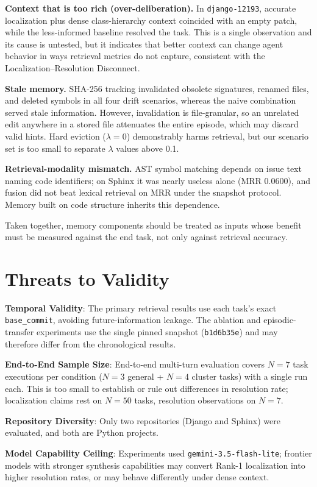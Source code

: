 \documentclass[conference]{IEEEtran}
\begin{document}
\textbf{Context that is too rich (over-deliberation).} In \texttt{django-12193}, accurate localization plus dense class-hierarchy context coincided with an empty patch, while the less-informed baseline resolved the task. This is a single observation and its cause is untested, but it indicates that better context can change agent behavior in ways retrieval metrics do not capture, consistent with the Localization--Resolution Disconnect.

\textbf{Stale memory.} SHA-256 tracking invalidated obsolete signatures, renamed files, and deleted symbols in all four drift scenarios, whereas the naive combination served stale information. However, invalidation is file-granular, so an unrelated edit anywhere in a stored file attenuates the entire episode, which may discard valid hints. Hard eviction ($\lambda = 0$) demonstrably harms retrieval, but our scenario set is too small to separate $\lambda$ values above 0.1.

\textbf{Retrieval-modality mismatch.} AST symbol matching depends on issue text naming code identifiers; on Sphinx it was nearly useless alone (MRR 0.0600), and fusion did not beat lexical retrieval on MRR under the snapshot protocol. Memory built on code structure inherits this dependence.

Taken together, memory components should be treated as inputs whose benefit must be measured against the end task, not only against retrieval accuracy.

\section{Threats to Validity}
\textbf{Temporal Validity}: The primary retrieval results use each task's exact \texttt{base\_commit}, avoiding future-information leakage. The ablation and episodic-transfer experiments use the single pinned snapshot (\texttt{b1d6b35e}) and may therefore differ from the chronological results.

\textbf{End-to-End Sample Size}: End-to-end multi-turn evaluation covers $N=7$ task executions per condition ($N=3$ general + $N=4$ cluster tasks) with a single run each. This is too small to establish or rule out differences in resolution rate; localization claims rest on $N=50$ tasks, resolution observations on $N=7$.

\textbf{Repository Diversity}: Only two repositories (Django and Sphinx) were evaluated, and both are Python projects.

\textbf{Model Capability Ceiling}: Experiments used \texttt{gemini-3.5-flash-lite}; frontier models with stronger synthesis capabilities may convert Rank-1 localization into higher resolution rates, or may behave differently under dense context.
\end{document}
